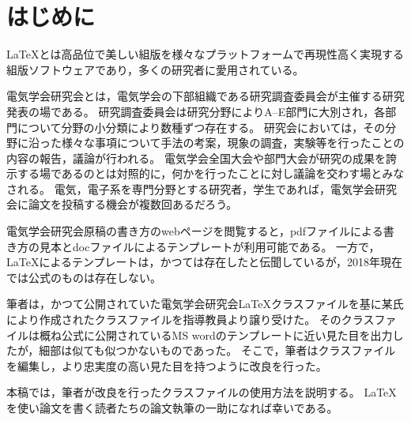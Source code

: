 \documentclass[platex,fleqn]{ieej-tec2}%
\begin{document}
%
\begin{abstract}
The class file \texttt{ieej-tec2.cls} has been developed for typesetting articles of IEEJ workshop.
The official class file for the workshop used to exist, however it is no longer available.
Now it becomes a very big problem for \TeX nicians.
I inherited the class file for the workshop from my boss, 
and editted some codes in order to achieve higher fidelity to the official MS word template.
Happy \TeX ing!!
\end{abstract}
\maketitle
%
%
\section{はじめに}
\LaTeX{}とは高品位で美しい組版を様々なプラットフォームで再現性高く実現する組版ソフトウェアであり，多くの研究者に愛用されている。

電気学会研究会とは，電気学会の下部組織である研究調査委員会が主催する研究発表の場である。
研究調査委員会は研究分野によりA--E部門に大別され，各部門について分野の小分類により数種ずつ存在する。
研究会においては，その分野に沿った様々な事項について手法の考案，現象の調査，実験等を行ったことの内容の報告，議論が行われる。
電気学会全国大会や部門大会が研究の成果を誇示する場であるのとは対照的に，何かを行ったことに対し議論を交わす場とみなされる。
電気，電子系を専門分野とする研究者，学生であれば，電気学会研究会に論文を投稿する機会が複数回あるだろう。

電気学会研究会原稿の書き方のwebページ\cite{IEEJformat}を閲覧すると，pdfファイルによる書き方の見本とdocファイルによるテンプレートが利用可能である。
一方で，\LaTeX{}によるテンプレートは，かつては存在したと伝聞しているが，2018年現在では公式のものは存在しない。

筆者は，かつて公開されていた電気学会研究会\LaTeX クラスファイルを基に某氏により作成されたクラスファイルを指導教員より譲り受けた。
そのクラスファイルは概ね公式に公開されているMS wordのテンプレートに近い見た目を出力したが，細部は似ても似つかないものであった。
そこで，筆者はクラスファイルを編集し，より忠実度の高い見た目を持つように改良を行った。

本稿では，筆者が改良を行ったクラスファイルの使用方法を説明する。
\LaTeX{}を使い論文を書く読者たちの論文執筆の一助になれば幸いである。
\end{document}
